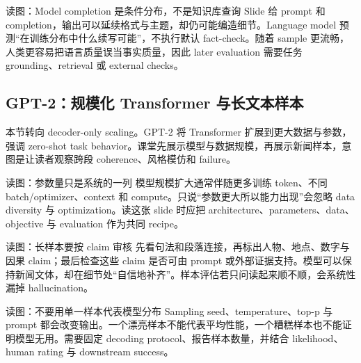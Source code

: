 \begin{knowledgebox}{读图：Model completion 是条件分布，不是知识库查询}
Slide 给 prompt 和 completion，输出可以延续格式与主题，却仍可能编造细节。Language model 预测“在训练分布中什么续写可能”，不执行默认 fact-check。随着 sample 更流畅，人类更容易把语言质量误当事实质量，因此 later evaluation 需要任务 grounding、retrieval 或 external checks。
\end{knowledgebox}

\subsection{GPT-2：规模化 Transformer 与长文本样本}

本节转向 decoder-only scaling。GPT-2 将 Transformer 扩展到更大数据与参数，强调 zero-shot task behavior。课堂先展示模型与数据规模，再展示新闻样本，意图是让读者观察跨段 coherence、风格模仿和 failure。


\begin{knowledgebox}{读图：参数量只是系统的一列}
模型规模扩大通常伴随更多训练 token、不同 batch/optimizer、context 和 compute。只说“参数更大所以能力出现”会忽略 data diversity 与 optimization。读这张 slide 时应把 architecture、parameters、data、objective 与 evaluation 作为共同 recipe。
\end{knowledgebox}


\begin{knowledgebox}{读图：长样本要按 claim 审核}
先看句法和段落连接，再标出人物、地点、数字与因果 claim；最后检查这些 claim 是否可由 prompt 或外部证据支持。模型可以保持新闻文体，却在细节处“自信地补齐”。样本评估若只问读起来顺不顺，会系统性漏掉 hallucination。
\end{knowledgebox}


\begin{knowledgebox}{读图：不要用单一样本代表模型分布}
Sampling seed、temperature、top-p 与 prompt 都会改变输出。一个漂亮样本不能代表平均性能，一个糟糕样本也不能证明模型无用。需要固定 decoding protocol、报告样本数量，并结合 likelihood、human rating 与 downstream success。
\end{knowledgebox}

